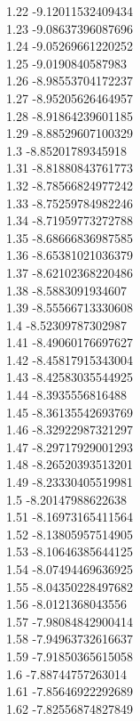 {1.22	-9.12011532409434\\
1.23	-9.08637396087696\\
1.24	-9.05269661220252\\
1.25	-9.0190840587983\\
1.26	-8.98553704172237\\
1.27	-8.95205626464957\\
1.28	-8.91864239601185\\
1.29	-8.88529607100329\\
1.3	-8.85201789345918\\
1.31	-8.81880843761773\\
1.32	-8.78566824977242\\
1.33	-8.75259784982246\\
1.34	-8.71959773272788\\
1.35	-8.68666836987585\\
1.36	-8.65381021036379\\
1.37	-8.62102368220486\\
1.38	-8.5883091934607\\
1.39	-8.55566713330608\\
1.4	-8.52309787302987\\
1.41	-8.49060176697627\\
1.42	-8.45817915343004\\
1.43	-8.42583035544925\\
1.44	-8.3935556816488\\
1.45	-8.36135542693769\\
1.46	-8.32922987321297\\
1.47	-8.29717929001293\\
1.48	-8.26520393513201\\
1.49	-8.23330405519981\\
1.5	-8.20147988622638\\
1.51	-8.16973165411564\\
1.52	-8.13805957514905\\
1.53	-8.10646385644125\\
1.54	-8.07494469636925\\
1.55	-8.04350228497682\\
1.56	-8.0121368043556\\
1.57	-7.98084842900414\\
1.58	-7.94963732616637\\
1.59	-7.91850365615058\\
1.6	-7.88744757263014\\
1.61	-7.85646922292689\\
1.62	-7.82556874827849\\
}
